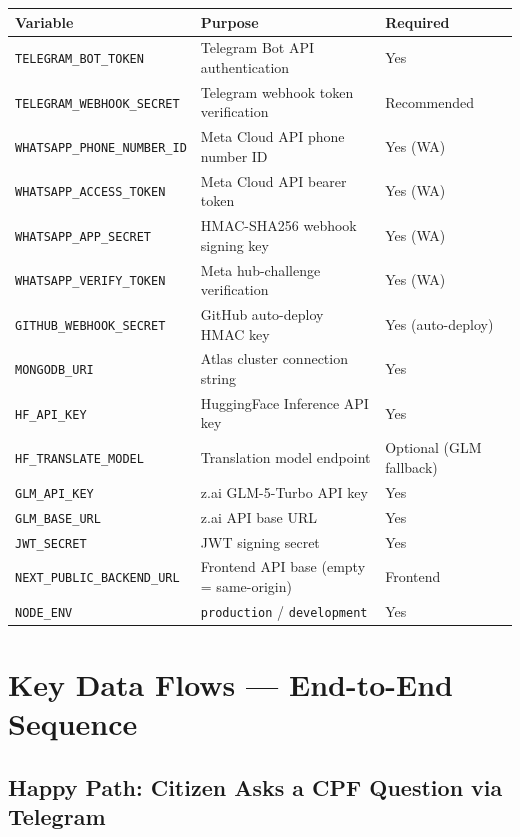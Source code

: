 \documentclass[12pt,a4paper]{article}
\begin{document}
\begin{longtable}{@{}lp{5cm}l@{}}
\toprule
\textbf{Variable} & \textbf{Purpose} & \textbf{Required} \\
\midrule
\endhead
\texttt{TELEGRAM\_BOT\_TOKEN}       & Telegram Bot API authentication & Yes \\
\texttt{TELEGRAM\_WEBHOOK\_SECRET}  & Telegram webhook token verification & Recommended \\
\texttt{WHATSAPP\_PHONE\_NUMBER\_ID} & Meta Cloud API phone number ID & Yes (WA) \\
\texttt{WHATSAPP\_ACCESS\_TOKEN}    & Meta Cloud API bearer token & Yes (WA) \\
\texttt{WHATSAPP\_APP\_SECRET}      & HMAC-SHA256 webhook signing key & Yes (WA) \\
\texttt{WHATSAPP\_VERIFY\_TOKEN}    & Meta hub-challenge verification & Yes (WA) \\
\texttt{GITHUB\_WEBHOOK\_SECRET}    & GitHub auto-deploy HMAC key & Yes (auto-deploy) \\
\texttt{MONGODB\_URI}               & Atlas cluster connection string & Yes \\
\texttt{HF\_API\_KEY}               & HuggingFace Inference API key & Yes \\
\texttt{HF\_TRANSLATE\_MODEL}       & Translation model endpoint & Optional (GLM fallback) \\
\texttt{GLM\_API\_KEY}              & z.ai GLM-5-Turbo API key & Yes \\
\texttt{GLM\_BASE\_URL}             & z.ai API base URL & Yes \\
\texttt{JWT\_SECRET}                & JWT signing secret & Yes \\
\texttt{NEXT\_PUBLIC\_BACKEND\_URL} & Frontend API base (empty = same-origin) & Frontend \\
\texttt{NODE\_ENV}                  & \texttt{production} / \texttt{development} & Yes \\
\bottomrule
\end{longtable}

\section{Key Data Flows — End-to-End Sequence}
\label{sec:flows}

\subsection{Happy Path: Citizen Asks a CPF Question via Telegram}
\end{document}

